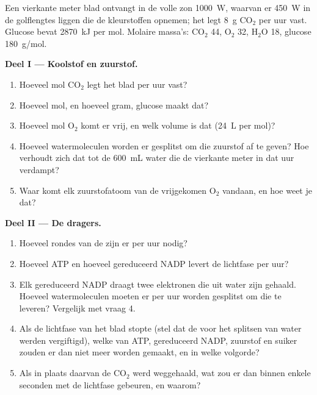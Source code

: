 \begin{problem}
\label{pb:g12:photosynthesis:1}
Een vierkante meter blad ontvangt in de volle zon \qty{1000}{W}, waarvan
er \qty{450}{W} in de golflengtes liggen die de kleurstoffen opnemen; het
legt \qty{8}{g} $\mathrm{CO_2}$ per uur vast. Glucose bevat \qty{2870}{kJ}
per mol. Molaire massa's: $\mathrm{CO_2}$ 44, $\mathrm{O_2}$ 32,
$\mathrm{H_2O}$ 18, glucose \qty{180}{g/mol}.

\medskip
\noindent\textbf{Deel I --- Koolstof en zuurstof.}
\begin{enumerate}
  \item Hoeveel mol $\mathrm{CO_2}$ legt het blad per uur vast?
  \item Hoeveel mol, en hoeveel gram, glucose maakt dat?
  \item Hoeveel mol $\mathrm{O_2}$ komt er vrij, en welk volume is dat
        (\qty{24}{L} per mol)?
  \item Hoeveel watermoleculen worden er gesplitst om die zuurstof af te
        geven? Hoe verhoudt zich dat tot de \qty{600}{mL} water die de
        vierkante meter in dat uur verdampt?
  \item Waar komt elk zuurstofatoom van de vrijgekomen $\mathrm{O_2}$
        vandaan, en hoe weet je dat?
\end{enumerate}

\medskip
\noindent\textbf{Deel II --- De dragers.}
\begin{enumerate}[resume]
  \item Hoeveel rondes van de  zijn er per uur nodig?
  \item Hoeveel ATP en hoeveel gereduceerd NADP levert de lichtfase per
        uur?
  \item Elk gereduceerd NADP draagt twee elektronen die uit water zijn
        gehaald. Hoeveel watermoleculen moeten er per uur worden gesplitst
        om die te leveren? Vergelijk met vraag 4.
  \item Als de lichtfase van het blad stopte (stel dat de
         voor het splitsen van water werden vergiftigd),
        welke van ATP, gereduceerd NADP, zuurstof en suiker zouden er dan
        niet meer worden gemaakt, en in welke volgorde?
  \item Als in plaats daarvan de $\mathrm{CO_2}$ werd weggehaald, wat zou
        er dan binnen enkele seconden met de lichtfase gebeuren, en waarom?
\end{enumerate}


\end{problem}
